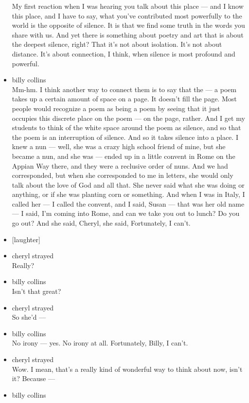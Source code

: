 \begin{itemize}
  My first reaction when I was hearing you talk about this place --- and
  I know this place, and I have to say, what you've contributed most
  powerfully to the world is the opposite of silence. It is that we find
  some truth in the words you share with us. And yet there is something
  about poetry and art that is about the deepest silence, right? That
  it's not about isolation. It's not about distance. It's about
  connection, I think, when silence is most profound and powerful.
\item
  billy collins\\
  Mm-hm. I think another way to connect them is to say that the --- a
  poem takes up a certain amount of space on a page. It doesn't fill the
  page. Most people would recognize a poem as being a poem by seeing
  that it just occupies this discrete place on the poem --- on the page,
  rather. And I get my students to think of the white space around the
  poem as silence, and so that the poem is an interruption of silence.
  And so it takes silence into a place. I knew a nun --- well, she was a
  crazy high school friend of mine, but she became a nun, and she was
  --- ended up in a little convent in Rome on the Appian Way there, and
  they were a reclusive order of nuns. And we had corresponded, but when
  she corresponded to me in letters, she would only talk about the love
  of God and all that. She never said what she was doing or anything, or
  if she was planting corn or something. And when I was in Italy, I
  called her --- I called the convent, and I said, Susan --- that was
  her old name --- I said, I'm coming into Rome, and can we take you out
  to lunch? Do you go out? And she said, Cheryl, she said, Fortunately,
  I can't.
\item
  {[}laughter{]}
\item
  cheryl strayed\\
  Really?
\item
  billy collins\\
  Isn't that great?
\item
  cheryl strayed\\
  So she'd ---
\item
  billy collins\\
  No irony --- yes. No irony at all. Fortunately, Billy, I can't.
\item
  cheryl strayed\\
  Wow. I mean, that's a really kind of wonderful way to think about now,
  isn't it? Because ---
\item
  billy collins\\

\end{itemize}
